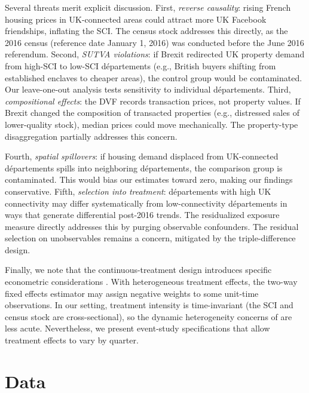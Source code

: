 \documentclass[12pt]{article}
\begin{document}
Several threats merit explicit discussion. First, \textit{reverse causality}: rising French housing prices in UK-connected areas could attract more UK Facebook friendships, inflating the SCI. The census stock addresses this directly, as the 2016 census (reference date January 1, 2016) was conducted before the June 2016 referendum. Second, \textit{SUTVA violations}: if Brexit redirected UK property demand from high-SCI to low-SCI d\'epartements (e.g., British buyers shifting from established enclaves to cheaper areas), the control group would be contaminated. Our leave-one-out analysis tests sensitivity to individual d\'epartements. Third, \textit{compositional effects}: the DVF records transaction prices, not property values. If Brexit changed the composition of transacted properties (e.g., distressed sales of lower-quality stock), median prices could move mechanically. The property-type disaggregation partially addresses this concern.

Fourth, \textit{spatial spillovers}: if housing demand displaced from UK-connected d\'epartements spills into neighboring d\'epartements, the comparison group is contaminated. This would bias our estimates toward zero, making our findings conservative. Fifth, \textit{selection into treatment}: d\'epartements with high UK connectivity may differ systematically from low-connectivity d\'epartements in ways that generate differential post-2016 trends. The residualized exposure measure directly addresses this by purging observable confounders. The residual selection on unobservables remains a concern, mitigated by the triple-difference design.

Finally, we note that the continuous-treatment design introduces specific econometric considerations \citep{callaway2021difference}. With heterogeneous treatment effects, the two-way fixed effects estimator may assign negative weights to some unit-time observations. In our setting, treatment intensity is time-invariant (the SCI and census stock are cross-sectional), so the dynamic heterogeneity concerns of \citet{sun2021estimating} are less acute. Nevertheless, we present event-study specifications that allow treatment effects to vary by quarter.


\section{Data}\label{sec:data}
\end{document}
